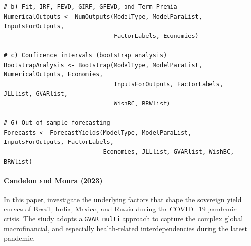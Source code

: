 \begin{verbatim}
# b) Fit, IRF, FEVD, GIRF, GFEVD, and Term Premia
NumericalOutputs <- NumOutputs(ModelType, ModelParaList, InputsForOutputs,
                               FactorLabels, Economies)

# c) Confidence intervals (bootstrap analysis)
BootstrapAnalysis <- Bootstrap(ModelType, ModelParaList, NumericalOutputs, Economies,
                               InputsForOutputs, FactorLabels, JLLlist, GVARlist,
                               WishBC, BRWlist)

# 6) Out-of-sample forecasting
Forecasts <- ForecastYields(ModelType, ModelParaList, InputsForOutputs, FactorLabels,
                            Economies, JLLlist, GVARlist, WishBC, BRWlist)
\end{verbatim}

\paragraph{Candelon and Moura (2023)}\label{candelon-and-moura-2023}

In this paper, \citet{CandelonMoura2023} investigate the underlying factors that shape the sovereign yield curves of Brazil, India, Mexico, and Russia during the COVID\(-19\) pandemic crisis. The study adopts a \texttt{GVAR\ multi} approach to capture the complex global macrofinancial, and especially health-related interdependencies during the latest pandemic.

